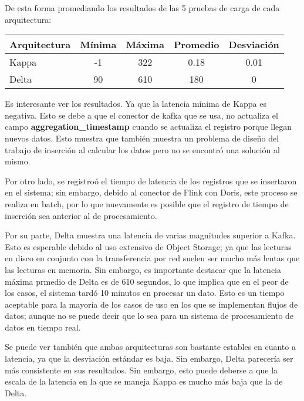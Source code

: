 De esta forma promediando los resultados de las 5 pruebas de carga de cada arquitectura: 

\begin{longtable}{|p{3cm}|c|c|c|c|}
    \hline
    \textbf{Arquitectura} & \textbf{Mínima} & \textbf{Máxima} & \textbf{Promedio}  & \textbf{Desviación} \\
    \hline
    Kappa & -1 & 322 & 0.18 & 0.01\\
    \hline
    Delta & 90 & 610 & 180 & 0\\
    \hline
\end{longtable}

Es interesante ver los resultados. Ya que la latencia mínima de Kappa es negativa. 
Esto se debe a que el conector de kafka que se usa, no actualiza el campo \textbf{aggregation\_timestamp} cuando se actualiza el registro porque llegan nuevos datos.
Esto muestra que también muestra un problema de diseño del trabajo de inserción al calcular los datos pero no se encontró una solución al mismo. \newline

Por otro lado, se registroó el tiempo de latencia de los registros que se insertaron en el sistema; sin embargo, debido al conector de Flink con Doris, 
este proceso se realiza en batch, por lo que nuevamente es posible que el registro de tiempo de inserción sea anterior al de procesamiento. 

\newpage

Por su parte, Delta muestra una latencia de varias magnitudes superior a Kafka. Esto es esperable debido al uso extensivo de Object Storage;
ya que las lecturas en disco en conjunto con la transferencia por red suelen ser mucho más lentas que las lecturas en memoria.
Sin embargo, es importante destacar que la latencia máxima prmedio de Delta es de 610 segundos, lo que implica que en el peor de los casos,
el sistema tardó 10 minutos en procesar un dato.
Esto es un tiempo aceptable para la mayoría de los casos de uso en los que se implementan flujos de datos; 
aunque no se puede decir que lo sea para un sistema de procesamiento de datos en tiempo real. \newline

Se puede ver también que ambas arquitecturas son bastante estables en cuanto a latencia, ya que la desviación estándar es baja.
Sin embargo, Delta parecería ser más consistente en sus resultados. 
Sin embargo, esto puede deberse a que la escala de la latencia en la que se maneja Kappa es mucho más baja que la de Delta. \newline

